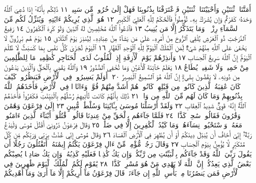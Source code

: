 أَمَتَّنَا ٱثْنَتَيْنِ وَأَحْيَيْتَنَا ٱثْنَتَيْنِ فَٱعْتَرَفْنَا بِذُنُوبِنَا فَهَلْ
إِلَىٰ خُرُوجࣲ مِّن سَبِيلࣲ ١١ ذَٰلِكُم بِأَنَّهُۥٓ إِذَا دُعِيَ ٱللَّهُ
وَحْدَهُۥ كَفَرْتُمْ وَإِن يُشْرَكْ بِهِۦ تُؤْمِنُوا۟ۚ فَٱلْحُكْمُ لِلَّهِ
ٱلْعَلِيِّ ٱلْكَبِيرِ ١٢ هُوَ ٱلَّذِي يُرِيكُمْ ءَايَٰتِهِۦ وَيُنَزِّلُ لَكُم مِّنَ
ٱلسَّمَآءِ رِزْقࣰاۚ وَمَا يَتَذَكَّرُ إِلَّا مَن يُنِيبُ ١٣ فَٱدْعُوا۟ ٱللَّهَ
مُخْلِصِينَ لَهُ ٱلدِّينَ وَلَوْ كَرِهَ ٱلْكَٰفِرُونَ ١٤ رَفِيعُ
ٱلدَّرَجَٰتِ ذُو ٱلْعَرْشِ يُلْقِي ٱلرُّوحَ مِنْ أَمْرِهِۦ عَلَىٰ مَن يَشَآءُ
مِنْ عِبَادِهِۦ لِيُنذِرَ يَوْمَ ٱلتَّلَاقِ ١٥ يَوْمَ هُم بَٰرِزُونَۖ لَا يَخْفَىٰ
عَلَى ٱللَّهِ مِنْهُمْ شَيْءࣱۚ لِّمَنِ ٱلْمُلْكُ ٱلْيَوْمَۖ لِلَّهِ ٱلْوَٰحِدِ ٱلْقَهَّارِ ١٦
ٱلْيَوْمَ تُجْزَىٰ كُلُّ نَفْسِۭ بِمَا كَسَبَتْۚ لَا ظُلْمَ ٱلْيَوْمَۚ إِنَّ
ٱللَّهَ سَرِيعُ ٱلْحِسَابِ ١٧ وَأَنذِرْهُمْ يَوْمَ ٱلْأٓزِفَةِ إِذِ ٱلْقُلُوبُ
لَدَى ٱلْحَنَاجِرِ كَٰظِمِينَۚ مَا لِلظَّٰلِمِينَ مِنْ حَمِيمࣲ وَلَا شَفِيعࣲ
يُطَاعُ ١٨ يَعْلَمُ خَآئِنَةَ ٱلْأَعْيُنِ وَمَا تُخْفِي ٱلصُّدُورُ ١٩ وَٱللَّهُ
يَقْضِي بِٱلْحَقِّۖ وَٱلَّذِينَ يَدْعُونَ مِن دُونِهِۦ لَا يَقْضُونَ
بِشَيْءٍۗ إِنَّ ٱللَّهَ هُوَ ٱلسَّمِيعُ ٱلْبَصِيرُ ٢٠۞ أَوَلَمْ يَسِيرُوا۟ فِي
ٱلْأَرْضِ فَيَنظُرُوا۟ كَيْفَ كَانَ عَٰقِبَةُ ٱلَّذِينَ كَانُوا۟ مِن قَبْلِهِمْۚ
كَانُوا۟ هُمْ أَشَدَّ مِنْهُمْ قُوَّةࣰ وَءَاثَارࣰا فِي ٱلْأَرْضِ فَأَخَذَهُمُ ٱللَّهُ
بِذُنُوبِهِمْ وَمَا كَانَ لَهُم مِّنَ ٱللَّهِ مِن وَاقࣲ ٢١ ذَٰلِكَ بِأَنَّهُمْ
كَانَت تَّأْتِيهِمْ رُسُلُهُم بِٱلْبَيِّنَٰتِ فَكَفَرُوا۟ فَأَخَذَهُمُ ٱللَّهُۚ
إِنَّهُۥ قَوِيࣱّ شَدِيدُ ٱلْعِقَابِ ٢٢ وَلَقَدْ أَرْسَلْنَا مُوسَىٰ بِـَٔايَٰتِنَا
وَسُلْطَٰنࣲ مُّبِينٍ ٢٣ إِلَىٰ فِرْعَوْنَ وَهَٰمَٰنَ وَقَٰرُونَ
فَقَالُوا۟ سَٰحِرࣱ كَذَّابࣱ ٢٤ فَلَمَّا جَآءَهُم بِٱلْحَقِّ مِنْ
عِندِنَا قَالُوا۟ ٱقْتُلُوٓا۟ أَبْنَآءَ ٱلَّذِينَ ءَامَنُوا۟ مَعَهُۥ وَٱسْتَحْيُوا۟
نِسَآءَهُمْۚ وَمَا كَيْدُ ٱلْكَٰفِرِينَ إِلَّا فِي ضَلَٰلࣲ ٢٥
وَقَالَ فِرْعَوْنُ ذَرُونِيٓ أَقْتُلْ مُوسَىٰ وَلْيَدْعُ رَبَّهُۥٓۖ إِنِّيٓ أَخَافُ
أَن يُبَدِّلَ دِينَكُمْ أَوْ أَن يُظْهِرَ فِي ٱلْأَرْضِ ٱلْفَسَادَ ٢٦
وَقَالَ مُوسَىٰٓ إِنِّي عُذْتُ بِرَبِّي وَرَبِّكُم مِّن كُلِّ مُتَكَبِّرࣲ لَّا يُؤْمِنُ
بِيَوْمِ ٱلْحِسَابِ ٢٧ وَقَالَ رَجُلࣱ مُّؤْمِنࣱ مِّنْ ءَالِ فِرْعَوْنَ
يَكْتُمُ إِيمَٰنَهُۥٓ أَتَقْتُلُونَ رَجُلًا أَن يَقُولَ رَبِّيَ ٱللَّهُ وَقَدْ
جَآءَكُم بِٱلْبَيِّنَٰتِ مِن رَّبِّكُمْۖ وَإِن يَكُ كَٰذِبࣰا فَعَلَيْهِ
كَذِبُهُۥۖ وَإِن يَكُ صَادِقࣰا يُصِبْكُم بَعْضُ ٱلَّذِي يَعِدُكُمْۖ
إِنَّ ٱللَّهَ لَا يَهْدِي مَنْ هُوَ مُسْرِفࣱ كَذَّابࣱ ٢٨ يَٰقَوْمِ لَكُمُ
ٱلْمُلْكُ ٱلْيَوْمَ ظَٰهِرِينَ فِي ٱلْأَرْضِ فَمَن يَنصُرُنَا مِنۢ بَأْسِ ٱللَّهِ
إِن جَآءَنَاۚ قَالَ فِرْعَوْنُ مَآ أُرِيكُمْ إِلَّا مَآ أَرَىٰ وَمَآ أَهْدِيكُمْ
